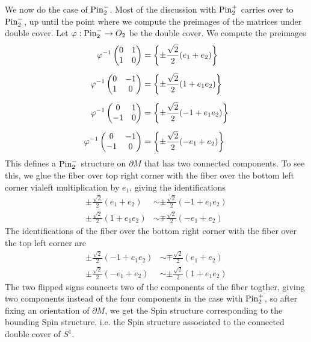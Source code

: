 \begin{exmp}
We now do the case of $\mathrm{Pin}^-_2$. Most of the discussion with $\mathrm{Pin}^+_2$ carries
over to $\mathrm{Pin}^-_2$, up until the point where we compute the preimages of
the matrices under double cover. Let $\varphi : \mathrm{Pin}_2^- \to O_2$ be the
double cover. We compute the preimages
%
\begin{align*}
\varphi^{-1}\begin{pmatrix}
0 & 1 \\
1 & 0
\end{pmatrix} &= \left\lbrace \pm \frac{\sqrt{2}}{2}(e_1 + e_2) \right\rbrace \\[5pt]
\varphi^{-1}\begin{pmatrix}
0 & -1 \\
1 & 0
\end{pmatrix} &= \left\lbrace \pm\frac{\sqrt{2}}{2}(1 + e_1e_2) \right\rbrace \\[5pt]
\varphi^{-1}\begin{pmatrix}
0 & 1 \\
-1 & 0
\end{pmatrix} &= \left\lbrace \pm\frac{\sqrt{2}}{2}(-1 + e_1e_2) \right\rbrace \\[5pt]
\varphi^{-1}\begin{pmatrix}
0 & -1 \\
-1 & 0
\end{pmatrix} &= \left\lbrace \pm\frac{\sqrt{2}}{2}(-e_1 + e_2) \right\rbrace
\end{align*}
%
This defines a $\mathrm{Pin}^-_2$ structure on $\partial M$ that has two connected
components. To see this, we glue the fiber over top right corner
with the fiber over the bottom left corner vialeft multiplication by $e_1$,
giving the identifications
%
\begin{align*}
\pm \frac{\sqrt{2}}{2}(e_1 + e_2) &\sim \pm\frac{\sqrt{2}}{2}(-1 + e_1e_2) \\
\pm\frac{\sqrt{2}}{2}(1 + e_1e_2) &\sim \mp\frac{\sqrt{2}}{2}(-e_1 + e_2)
\end{align*}
%
The identifications of the fiber over the bottom right corner with the fiber
over the top left corner are
%
\begin{align*}
\pm\frac{\sqrt{2}}{2}(-1 + e_1e_2) &\sim \mp\frac{\sqrt{2}}{2}(e_1 + e_2)\\
\pm\frac{\sqrt{2}}{2}(-e_1 + e_2) &\sim \pm\frac{\sqrt{2}}{2}(1 + e_1e_2)
\end{align*}
The two flipped signs connects two of the components of the fiber togther,
giving two components instead of the four components in the case with
$\mathrm{Pin}^+_2$, so after fixing an orientation of $\partial M$, we get the Spin
structure corresponding to the bounding Spin structure, i.e. the Spin structure
associated to the connected double cover of $S^1$.
%
\end{exmp}
